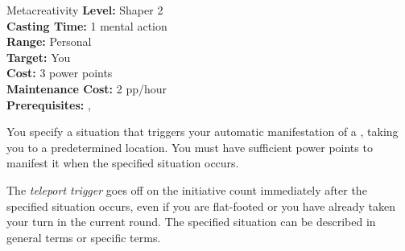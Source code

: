 {Metacreativity}
{
	\textbf{Level:}
	Shaper 2\\
	\textbf{Casting Time:}
	1 mental action\\
	\textbf{Range:}
	Personal\\
	\textbf{Target:}
	You\\
	\textbf{Cost:}
	3 power points\\
	\textbf{Maintenance Cost:}
	2 pp/hour\\
	\textbf{Prerequisites:}
	, \\
}
{
	You specify a situation that triggers your automatic manifestation of a , taking you to a predetermined location. You must have sufficient power points to manifest it when the specified situation occurs.

	The \emph{teleport trigger} goes off on the initiative count immediately after the specified situation occurs, even if you are flat-footed or you have already taken your turn in the current round. The specified situation can be described in general terms or specific terms.
}